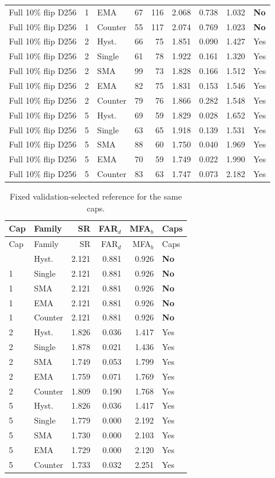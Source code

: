 {\begin{longtable}{lllrrrrrl}
Full 10\% flip D256 & 1 & EMA & 67 & 116 & 2.068 & 0.738 & 1.032 & \textbf{No}\\
Full 10\% flip D256 & 1 & Counter & 55 & 117 & 2.074 & 0.769 & 1.023 & \textbf{No}\\
Full 10\% flip D256 & 2 & Hyst. & 66 & 75 & 1.851 & 0.090 & 1.427 & Yes\\
Full 10\% flip D256 & 2 & Single & 61 & 78 & 1.922 & 0.161 & 1.320 & Yes\\
Full 10\% flip D256 & 2 & SMA & 99 & 73 & 1.828 & 0.166 & 1.512 & Yes\\
Full 10\% flip D256 & 2 & EMA & 82 & 75 & 1.831 & 0.153 & 1.546 & Yes\\
Full 10\% flip D256 & 2 & Counter & 79 & 76 & 1.866 & 0.282 & 1.548 & Yes\\
Full 10\% flip D256 & 5 & Hyst. & 69 & 59 & 1.829 & 0.028 & 1.652 & Yes\\
Full 10\% flip D256 & 5 & Single & 63 & 65 & 1.918 & 0.139 & 1.531 & Yes\\
Full 10\% flip D256 & 5 & SMA & 88 & 60 & 1.750 & 0.040 & 1.969 & Yes\\
Full 10\% flip D256 & 5 & EMA & 70 & 59 & 1.749 & 0.022 & 1.990 & Yes\\
Full 10\% flip D256 & 5 & Counter & 83 & 63 & 1.747 & 0.073 & 2.182 & Yes\\
\end{longtable}}
{\footnotesize\setlength{\tabcolsep}{4pt}
\begin{longtable}{llrrrl}
\caption{Fixed validation-selected reference for the same caps.}\label{tab:s7_static_ref}\\
\toprule
Cap & Family & SR & FAR$_d$ & MFA$_b$ & Caps\\
\midrule
\endfirsthead
\toprule
Cap & Family & SR & FAR$_d$ & MFA$_b$ & Caps\\
\midrule
\endhead
\bottomrule
\endfoot
1 & Hyst. & 2.121 & 0.881 & 0.926 & \textbf{No}\\
1 & Single & 2.121 & 0.881 & 0.926 & \textbf{No}\\
1 & SMA & 2.121 & 0.881 & 0.926 & \textbf{No}\\
1 & EMA & 2.121 & 0.881 & 0.926 & \textbf{No}\\
1 & Counter & 2.121 & 0.881 & 0.926 & \textbf{No}\\
2 & Hyst. & 1.826 & 0.036 & 1.417 & Yes\\
2 & Single & 1.878 & 0.021 & 1.436 & Yes\\
2 & SMA & 1.749 & 0.053 & 1.799 & Yes\\
2 & EMA & 1.759 & 0.071 & 1.769 & Yes\\
2 & Counter & 1.809 & 0.190 & 1.768 & Yes\\
5 & Hyst. & 1.826 & 0.036 & 1.417 & Yes\\
5 & Single & 1.779 & 0.000 & 2.192 & Yes\\
5 & SMA & 1.730 & 0.000 & 2.103 & Yes\\
5 & EMA & 1.729 & 0.000 & 2.120 & Yes\\
5 & Counter & 1.733 & 0.032 & 2.251 & Yes\\
\end{longtable}}
